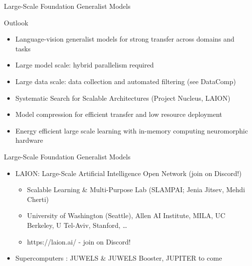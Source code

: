 \begin{frame}{Large-Scale Foundation Generalist Models}
\protect\hypertarget{large-scale-foundation-generalist-models}{}
\begin{block}{Outlook}
\protect\hypertarget{outlook}{}
\begin{itemize}
\tightlist
\item
  Language-vision generalist models for strong transfer across domains
  and tasks
\item
  Large model scale: hybrid parallelism required
\item
  Large data scale: data collection and automated filtering (see
  DataComp)
\item
  Systematic Search for Scalable Architectures (Project Nucleus, LAION)
\item
  Model compression for efficient transfer and low resource deployment
\item
  Energy efficient large scale learning with in-memory computing
  neuromorphic hardware
\end{itemize}
\end{block}

\end{frame}

\begin{frame}{Large-Scale Foundation Generalist Models}
\protect\hypertarget{large-scale-foundation-generalist-models-1}{}
\begin{itemize}
\tightlist
\item
  LAION: Large-Scale Artificial Intelligence Open Network (join on
  Discord!)

  \begin{itemize}
  \tightlist
  \item
    Scalable Learning \& Multi-Purpose Lab (SLAMPAI; Jenia Jitsev, Mehdi
    Cherti)
  \item
    University of Washington (Seattle), Allen AI Institute, MILA, UC
    Berkeley, U Tel-Aviv, Stanford, \ldots{}
  \item
    https://laion.ai/ - join on Discord!
  \end{itemize}
\item
  Supercomputers : JUWELS \& JUWELS Booster, JUPITER to come
\end{itemize}

\end{frame}

